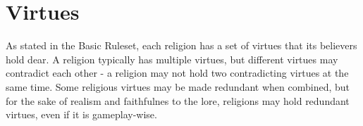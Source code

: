 \section{Virtues}
As stated in the Basic Ruleset, each religion has a set of virtues that its believers hold dear. A religion typically has multiple virtues, but different virtues may contradict each other - a religion may not hold two contradicting virtues at the same time. Some religious virtues may be made redundant when combined, but for the sake of realism and faithfulnes to the lore, religions may hold redundant virtues, even if it is  gameplay-wise.
